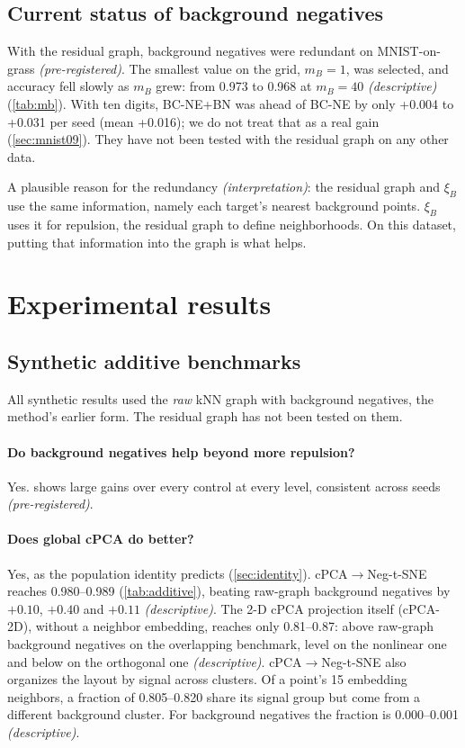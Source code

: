 \documentclass[10pt]{article}
\newcommand{\methodname}{BC-NE}
\newcommand{\BN}{\methodname{}+BN}
\newcommand{\cpre}{\textit{\small (pre-registered)}}
\newcommand{\cdesc}{\textit{\small (descriptive)}}
\newcommand{\cinterp}{\textit{\small (interpretation)}}
\newcommand{\xiB}{\xi_{B}}
\begin{document}
\subsection{Current status of background negatives}

With the residual graph, background negatives were redundant on MNIST-on-grass \cpre. The smallest value on the grid, $m_B = 1$, was selected, and accuracy fell slowly as $m_B$ grew: from 0.973 to 0.968 at $m_B = 40$ \cdesc{} (\cref{tab:mb}). With ten digits, \BN{} was ahead of \methodname{} by only +0.004 to +0.031 per seed (mean +0.016); we do not treat that as a real gain (\cref{sec:mnist09}). They have not been tested with the residual graph on any other data.

A plausible reason for the redundancy \cinterp: the residual graph and $\xiB$ use the same information, namely each target's nearest background points. $\xiB$ uses it for repulsion, the residual graph to define neighborhoods. On this dataset, putting that information into the graph is what helps.

\section{Experimental results}
\label{sec:evidence}

\subsection{Synthetic additive benchmarks}

All synthetic results used the \emph{raw} kNN graph with background negatives, the method's earlier form. The residual graph has not been tested on them.

\paragraph{Do background negatives help beyond more repulsion?} Yes.  shows large gains over every control at every level, consistent across seeds \cpre.

\paragraph{Does global cPCA do better?} Yes, as the population identity predicts (\cref{sec:identity}). cPCA$\to$Neg-t-SNE reaches 0.980--0.989 (\cref{tab:additive}), beating raw-graph background negatives by $+0.10$, $+0.40$ and $+0.11$ \cdesc. The 2-D cPCA projection itself (cPCA-2D), without a neighbor embedding, reaches only 0.81--0.87: above raw-graph background negatives on the overlapping benchmark, level on the nonlinear one and below on the orthogonal one \cdesc. cPCA$\to$Neg-t-SNE also organizes the layout by signal across clusters. Of a point's 15 embedding neighbors, a fraction of 0.805--0.820 share its signal group but come from a different background cluster. For background negatives the fraction is 0.000--0.001 \cdesc.
\end{document}
